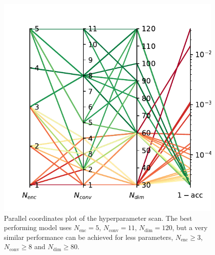 \documentclass[10pt,conference,compsocconf,a4paper]{IEEEtran}
\begin{document}
	\begin{figure}
		\centering
		\includegraphics[width=\linewidth]{figures/hparams.pdf}
		\caption{Parallel coordinates plot of the hyperparameter scan. The best performing model uses $N_\textrm{enc}=5$, $N_\textrm{conv}=11$, $N_\textrm{dim}=120$, but a very similar performance can be achieved for less parameters, $N_\textrm{enc} \geq 3$, $N_\textrm{conv} \geq 8$ and $N_\textrm{dim} \geq 80$.}
		\label{fig:hparams}
	\end{figure}
\end{document}

